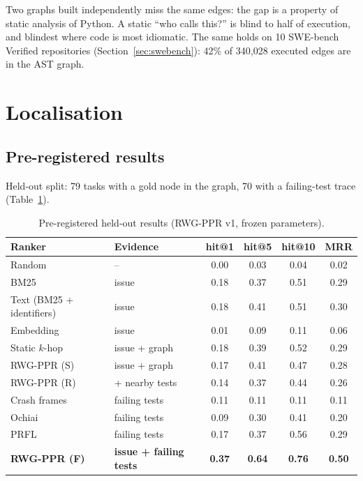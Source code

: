 \documentclass[10pt]{article}
\begin{document}
Two graphs built independently miss the same edges: the gap is a property of static analysis of Python. A static
``who calls this?'' is blind to half of execution, and blindest where code is most idiomatic. The same holds on 10
SWE-bench Verified repositories (Section~\ref{sec:swebench}): 42\% of 340{,}028 executed edges are in the AST graph.

\section{Localisation}

\subsection{Pre-registered results}

Held-out split: 79 tasks with a gold node in the graph, 70 with a failing-test trace (Table~\ref{tab:e1}).

\begin{table}[h]
\centering\small
\begin{tabular}{llcccc}
\toprule
Ranker & Evidence & hit@1 & hit@5 & hit@10 & MRR \\
\midrule
Random & -- & 0.00 & 0.03 & 0.04 & 0.02 \\
BM25 & issue & 0.18 & 0.37 & 0.51 & 0.29 \\
Text (BM25 + identifiers) & issue & 0.18 & 0.41 & 0.51 & 0.30 \\
Embedding & issue & 0.01 & 0.09 & 0.11 & 0.06 \\
Static $k$-hop & issue + graph & 0.18 & 0.39 & 0.52 & 0.29 \\
RWG-PPR (S) & issue + graph & 0.17 & 0.41 & 0.47 & 0.28 \\
RWG-PPR (R) & + nearby tests & 0.14 & 0.37 & 0.44 & 0.26 \\
Crash frames & failing tests & 0.11 & 0.11 & 0.11 & 0.11 \\
Ochiai & failing tests & 0.09 & 0.30 & 0.41 & 0.20 \\
PRFL & failing tests & 0.17 & 0.37 & 0.56 & 0.29 \\
\textbf{RWG-PPR (F)} & \textbf{issue + failing tests} & \textbf{0.37} & \textbf{0.64} & \textbf{0.76} & \textbf{0.50} \\
\bottomrule
\end{tabular}
\caption{Pre-registered held-out results (RWG-PPR v1, frozen parameters).}
\label{tab:e1}
\end{table}
\end{document}
